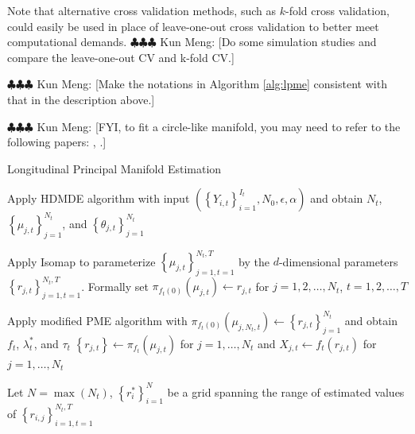 \documentclass[11pt,reqno]{article}
\newcommand{\meng}[1]{{\color{purple} \sf $\clubsuit\clubsuit\clubsuit$ Kun Meng: [#1]}}
\theoremstyle{definition}
\begin{document}
Note that alternative cross validation methods, such as $k$-fold cross validation, could easily be used in place of leave-one-out cross validation to better meet computational demands. \meng{Do some simulation studies and compare the leave-one-out CV and k-fold CV.}

\LinesNumbered


\LinesNumbered

\meng{Make the notations in Algorithm \ref{alg:lpme} consistent with that in the description above.}

\meng{FYI, to fit a circle-like manifold, you may need to refer to the following papers: \cite{fasy2014confidence}, \cite{dunson2021inferring}.}

\begin{algorithm}
\caption{Longitudinal Principal Manifold Estimation}\label{alg:lpme}
 {
  Apply HDMDE algorithm with input $\left(\left\{Y_{i, t}\right\}_{i = 1}^{I_t}, N_0, \epsilon, \alpha\right)$ and obtain $N_t$, $\left\{\mu_{j, t}\right\}_{j = 1}^{N_t}$, and $\left\{\theta_{j, t}\right\}_{j = 1}^{N_t}$\;
}

  Apply Isomap to parameterize $\left\{\mu_{j, t}\right\}_{j = 1, t = 1}^{N_t, T}$ by the $d$-dimensional parameters $\left\{r_{j, t}\right\}_{j = 1, t = 1}^{N_t, T}$. Formally set $\pi_{f_t(0)}(\mu_{j, t}) \gets r_{j, t}$ for $j = 1, 2, \dots, N_t$, $t = 1, 2, \dots, T$\;

 {
  Apply modified PME algorithm with $\pi_{f_t(0)}(\mu_{j, N_t, t}) \gets \left\{r_{j, t}\right\}_{j = 1}^{N_t}$ and obtain $f_t$, $\lambda_t^*$, and $\tau_t$\;
  $\left\{r_{j, t}\right\} \gets \pi_{f_t}(\mu_{j, t})$ for $j = 1, \dots, N_t$ and $X_{j, t} \gets f_t(r_{j, t})$ for $j = 1, \dots, N_t$\;
}

  Let $N = \max(N_t)$, $\left\{r_i^*\right\}_{i=1}^{N}$ be a grid spanning the range of estimated values of $\left\{r_{i, j}\right\}_{i=1, t=1}^{N_t, T}$\; 


\end{algorithm}
\end{document}
